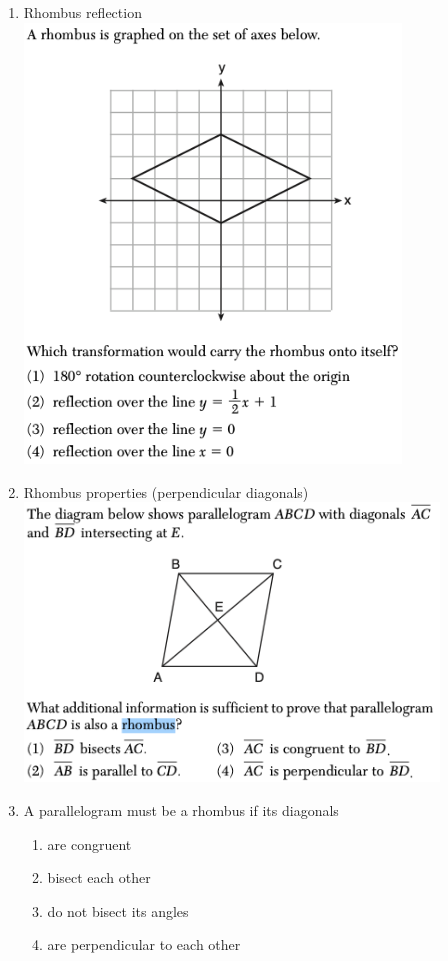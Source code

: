 \documentclass[12pt, oneside]{article}
\begin{document}
\begin{enumerate}
\newpage
\item Rhombus reflection\\
\includegraphics[width=10cm]{R-4images/R-4RhombusJ.png}

\item Rhombus properties (perpendicular diagonals)\\
\includegraphics[width=11cm]{R-4images/R-4RhombusD.png}

\newpage
\item A parallelogram must be a rhombus if its diagonals
\begin{enumerate}
    \item are congruent
    \item bisect each other
    \item do not bisect its angles
    \item are perpendicular to each other
\end{enumerate}


\end{enumerate}
\end{document}
